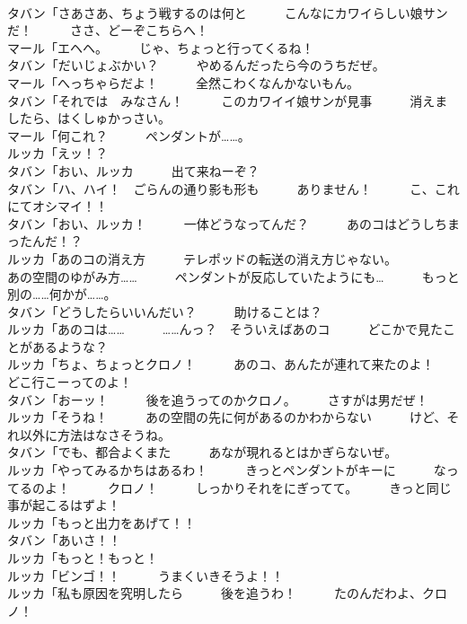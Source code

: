 \documentclass[8pt]{extreport}
\begin{document}
\begin{CJK}{UTF8}{min}
\\	タバン「さあさあ、ちょう戦するのは何と　　　こんなにカワイらしい娘サンだ！　　　ささ、どーぞこちらへ！	
\\	マール「エヘヘ。　　　じゃ、ちょっと行ってくるね！	
\\	タバン「だいじょぶかい？　　　やめるんだったら今のうちだぜ。	
\\	マール「へっちゃらだよ！　　　全然こわくなんかないもん。	
\\	タバン「それでは　みなさん！　　　このカワイイ娘サンが見事　　　消えましたら、はくしゅかっさい。	
\\	マール「何これ？　　　ペンダントが……。	
\\	ルッカ「えッ！？	
\\	タバン「おい、ルッカ　　　出て来ねーぞ？	
\\	タバン「ハ、ハイ！　ごらんの通り影も形も　　　ありません！　　　こ、これにてオシマイ！！	
\\	タバン「おい、ルッカ！　　　一体どうなってんだ？　　　あのコはどうしちまったんだ！？	
\\	ルッカ「あのコの消え方　　　テレポッドの転送の消え方じゃない。	
\\	あの空間のゆがみ方……　　　ペンダントが反応していたようにも…　　　もっと別の……何かが……。	
\\	タバン「どうしたらいいんだい？　　　助けることは？	
\\	ルッカ「あのコは……　　　……んっ？　そういえばあのコ　　　どこかで見たことがあるような？	
\\	ルッカ「ちょ、ちょっとクロノ！　　　あのコ、あんたが連れて来たのよ！　　　どこ行こーってのよ！	
\\	タバン「おーッ！　　　後を追うってのかクロノ。　　　さすがは男だぜ！	
\\	ルッカ「そうね！　　　あの空間の先に何があるのかわからない　　　けど、それ以外に方法はなさそうね。	
\\	タバン「でも、都合よくまた　　　あなが現れるとはかぎらないぜ。	
\\	ルッカ「やってみるかちはあるわ！　　　きっとペンダントがキーに　　　なってるのよ！　　　クロノ！　　　しっかりそれをにぎってて。　　　きっと同じ事が起こるはずよ！	
\\	ルッカ「もっと出力をあげて！！	
\\	タバン「あいさ！！	
\\	ルッカ「もっと！もっと！	
\\	ルッカ「ビンゴ！！　　　うまくいきそうよ！！	
\\	ルッカ「私も原因を究明したら　　　後を追うわ！　　　たのんだわよ、クロノ！	

\end{CJK}
\end{document}
